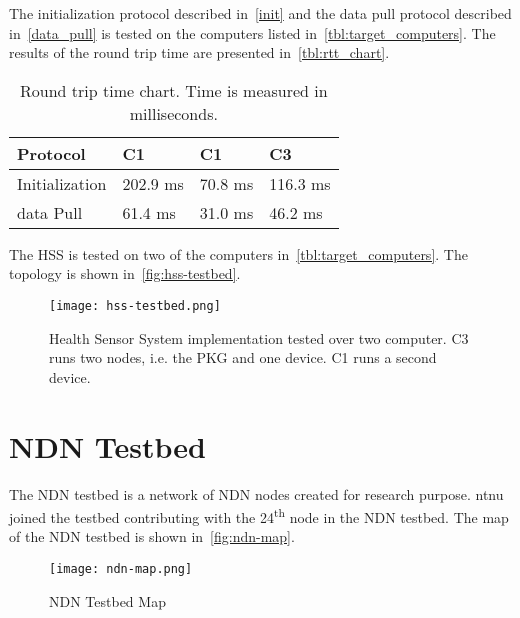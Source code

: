 The initialization protocol described in~\autoref{init} and the \gls{data} pull protocol described in~\autoref{data_pull} is tested on the computers listed in~\autoref{tbl:target_computers}.
The results of the round trip time are presented in~\autoref{tbl:rtt_chart}.
\begin{table}[h]
  \begin{tabular}[c]{p{}p{}p{}p{}}
  Protocol                                & C1            & C1            & C3            \\ \hline
  Initialization                          & 202.9 ms      & 70.8 ms       & 116.3 ms     \\ %
  \gls{data} Pull                               & 61.4 ms       & 31.0 ms       & 46.2 ms     \\ %
  \end{tabular}
  \caption{Round trip time chart. Time is measured in milliseconds.}
  \label{tbl:rtt_chart}
\end{table}

The \gls{HSS} is tested on two of the computers in~\autoref{tbl:target_computers}.
The topology is shown in~\autoref{fig:hss-testbed}.
\begin{figure}[ht]
  \centering
  \texttt{[image: hss-testbed.png]}
  \caption{Health Sensor System implementation tested over two computer. C3 runs two nodes, i.e. the PKG and one device. C1 runs a second device.}
  \label{fig:hss-testbed}
\end{figure}

\section{NDN Testbed}
The \gls{NDN} testbed is a network of \gls{NDN} nodes created for research purpose. 
\gls{ntnu} joined the testbed contributing with the 24\textsuperscript{th} node in the NDN testbed.
The map of the NDN testbed is shown in~\autoref{fig:ndn-map}.

\begin{figure}[ht]
  \centering
  \texttt{[image: ndn-map.png]}
  \caption{NDN Testbed Map}
  \label{fig:ndn-map}
\end{figure}
